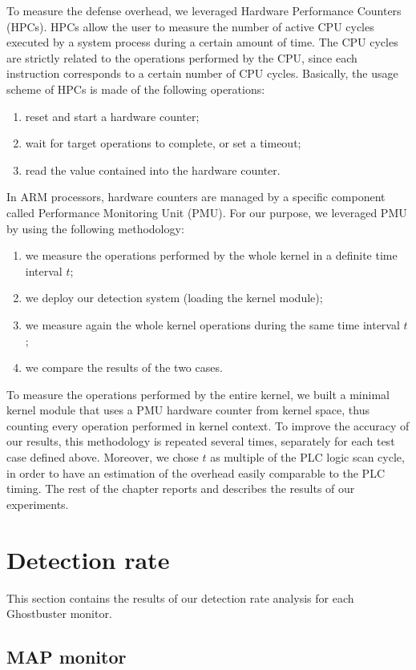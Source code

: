To measure the defense overhead, we leveraged Hardware Performance Counters (HPCs).
HPCs allow the user to measure the number of active CPU cycles executed by a system process during a certain amount of time.
The CPU cycles are strictly related to the operations performed by the CPU, since each instruction corresponds to a certain number of CPU cycles.
Basically, the usage scheme of HPCs is made of the following operations:
\begin{enumerate}
	\item reset and start a hardware counter;
	\item wait for target operations to complete, or set a timeout;
	\item read the value contained into the hardware counter.
\end{enumerate}
In ARM processors, hardware counters are managed by a specific component called Performance Monitoring Unit (PMU).
For our purpose, we leveraged PMU by using the following methodology:
\begin{enumerate}
	\item we measure the operations performed by the whole kernel in a definite time interval $t$;
	\item we deploy our detection system (loading the kernel module);
	\item we measure again the whole kernel operations during the same time interval $t$;
	\item we compare the results of the two cases.
\end{enumerate}
To measure the operations performed by the entire kernel, we built a minimal kernel module that uses a PMU hardware counter from kernel space,
thus counting every operation performed in kernel context.
To improve the accuracy of our results, this methodology is repeated several times, separately for each test case defined above.
Moreover, we chose $t$ as multiple of the PLC logic scan cycle, in order to have an estimation of the overhead easily comparable to the PLC timing.
The rest of the chapter reports and describes the results of our experiments.


\section{Detection rate}

This section contains the results of our detection rate analysis for each Ghostbuster monitor.


\subsection{MAP monitor}

